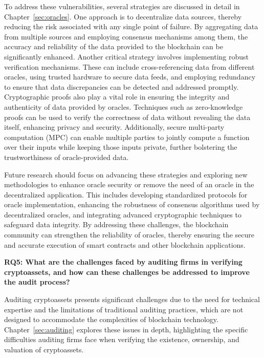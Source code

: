 To address these vulnerabilities, several strategies are discussed in detail in Chapter~\ref{sec:oracles}. One approach is to decentralize data sources, thereby reducing the risk associated with any single point of failure. By aggregating data from multiple sources and employing consensus mechanisms among them, the accuracy and reliability of the data provided to the blockchain can be significantly enhanced. Another critical strategy involves implementing robust verification mechanisms. These can include cross-referencing data from different oracles, using trusted hardware to secure data feeds, and employing redundancy to ensure that data discrepancies can be detected and addressed promptly. Cryptographic proofs also play a vital role in ensuring the integrity and authenticity of data provided by oracles. Techniques such as zero-knowledge proofs can be used to verify the correctness of data without revealing the data itself, enhancing privacy and security. Additionally, secure multi-party computation (MPC) can enable multiple parties to jointly compute a function over their inputs while keeping those inputs private, further bolstering the trustworthiness of oracle-provided data.

Future research should focus on advancing these strategies and exploring new methodologies to enhance oracle security or remove the need of an oracle in the decentralized application. This includes developing standardized protocols for oracle implementation, enhancing the robustness of consensus algorithms used by decentralized oracles, and integrating advanced cryptographic techniques to safeguard data integrity. By addressing these challenges, the blockchain community can strengthen the reliability of oracles, thereby ensuring the secure and accurate execution of smart contracts and other blockchain applications.



\textbf{RQ5: What are the challenges faced by auditing firms in verifying cryptoassets, and how can these challenges be addressed to improve the audit process?}

Auditing cryptoassets presents significant challenges due to the need for technical expertise and the limitations of traditional auditing practices, which are not designed to accommodate the complexities of blockchain technology. Chapter~\ref{sec:auditing} explores these issues in depth, highlighting the specific difficulties auditing firms face when verifying the existence, ownership, and valuation of cryptoassets.

